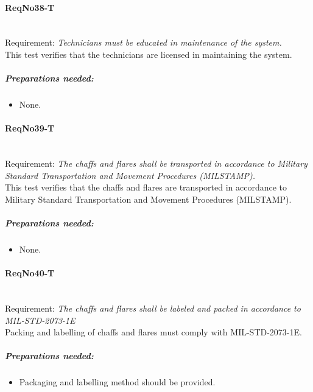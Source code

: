 \paragraph{ReqNo38-T}\mbox{}\\ %
Requirement: \textit{Technicians must be educated in maintenance of the system.}\\
This test verifies that the technicians are licensed in maintaining the system.
	\subparagraph{Preparations needed:}
	\begin{itemize}
	\item None.
	\end{itemize}


\paragraph{ReqNo39-T}\mbox{}\\ %
Requirement: \textit{The chaffs and flares shall be transported in accordance to Military Standard Transportation and Movement Procedures (MILSTAMP).}\\

This test verifies that the chaffs and flares are transported in accordance to Military Standard Transportation and Movement Procedures (MILSTAMP).
	\subparagraph{Preparations needed:}
	\begin{itemize}
	\item None. 
	\end{itemize}

\paragraph{ReqNo40-T}\mbox{}\\ %
Requirement: \textit{The chaffs and flares shall be labeled and packed in accordance to MIL-STD-2073-1E}\\
Packing and labelling of chaffs and flares must comply with MIL-STD-2073-1E.

	\subparagraph{Preparations needed:}
	\begin{itemize}
	\item Packaging and labelling method should be provided. 
	\end{itemize}
